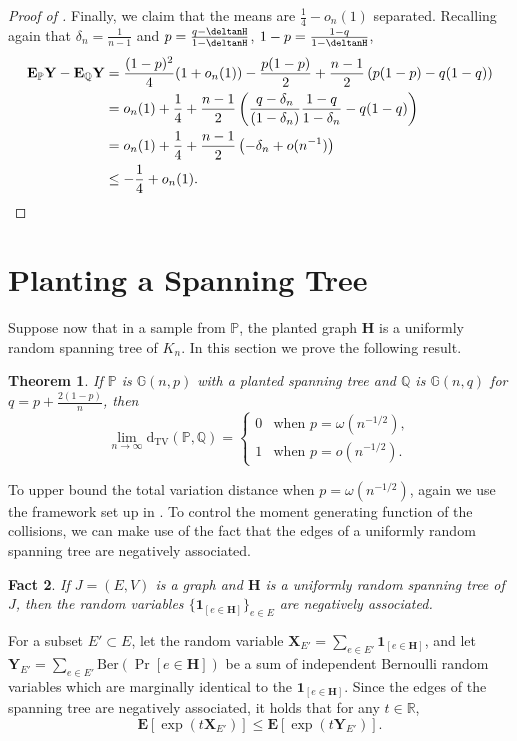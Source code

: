 \documentclass[11pt]{article}
\providecommand{\R}{}
\renewcommand{\R}{\mathbb{R}}
\newcommand{\e}{{\mathbf E}}
\newcommand{\Ind}[1]{{\mathbf 1}_{[#1]}}
\newcommand{\dtv}{\mathrm{d}_{\mathrm{TV}}}
\newcommand{\bH}{\mathbf{H}}
\newcommand{\bX}{\mathbf{X}}
\newcommand{\bY}{\mathbf{Y}}
\newcommand{\bbG}{\mathbb{G}}
\newcommand{\bbP}{\mathbb{P}}
\newcommand{\bbQ}{\mathbb{Q}}
\newtheorem{thm}{Theorem}
\newtheorem{fact}[thm]{Fact}
\numberwithin{equation}{section}
\numberwithin{thm}{section}
\newcommand{\Ber}{\mathrm{Ber}}
\begin{document}
\begin{proof}[Proof of ]
Finally, we claim that the means are $\frac{1}{4} - o_n(1)$ separated.
Recalling again that $\delta_n = \frac{1}{n-1}$ and $p = \frac{q-\deltanH}{1-\deltanH}$, $1-p = \frac{1-q}{1-\deltanH}$,
\begin{align*}
\e_{\bbP} \bY - \e_{\bbQ} \bY 
&= \frac{(1-p)^2}{4}(1+o_n(1)) - \frac{p(1-p)}{2} + \frac{n-1}{2}\left(p(1-p) - q(1-q)\right)\\
&= o_n(1) + \frac{1}{4} + \frac{n-1}{2}\left(\frac{q-\delta_n}{(1-\delta_n)}\frac{1-q}{1-\delta_n} - q(1-q)\right)\\
&= o_n(1) + \frac{1}{4} + \frac{n-1}{2}\left(-\delta_n + o(n^{-1}) \right)\\
&\le - \frac{1}{4} + o_n(1). \qedhere
\end{align*}
\end{proof}

\section{Planting a Spanning Tree}
\label{sec:ST}

Suppose now that in a sample from $\bbP$, the planted graph $\bH$ is a uniformly random spanning tree of $K_n$. In this section we prove the following result. 

\begin{thm}\label{thm:spanning_tree}
If $\bbP$ is $\bbG(n,p)$ with a planted spanning tree and $\bbQ$ is $\bbG(n,q)$ for $q = p + \frac{2(1-p)}{n}$, then
\[
\lim_{n \to \infty} \dtv(\bbP,\bbQ) = \begin{cases}
0 & \text{when }p = \omega(n^{-1/2}),\\
1 & \text{when }p = o(n^{-1/2}).
\end{cases}
\]
\end{thm}

To upper bound the total variation distance when $p = \omega(n^{-1/2})$, again we use the framework set up in .
To control the moment generating function of the collisions, we can make use of the fact that the edges of a uniformly random spanning tree are negatively associated.

\begin{fact}\label{fact:neg-assoc}
    If $J = (E,V)$ is a graph and $\bH$ is a uniformly random spanning tree of $J$, then the random variables $\{\Ind{e \in \bH}\}_{e \in E}$ are negatively associated.
\end{fact}

For a subset $E' \subset E$, let the random variable $\bX_{E'} = \sum_{e \in E'} \Ind{e \in \bH}$, and let $\bY_{E'} = \sum_{e \in E'} \Ber(\Pr[e \in \bH])$ be a sum of independent Bernoulli random variables which are marginally identical to the $\Ind{e \in \bH}$.
Since the edges of the spanning tree are negatively associated, it holds \cite{Shao00} that for any $t \in \R$,
\[
\e[\exp(t \bX_{E'})] \le \e[\exp(t \bY_{E'})].
\]
\end{document}
